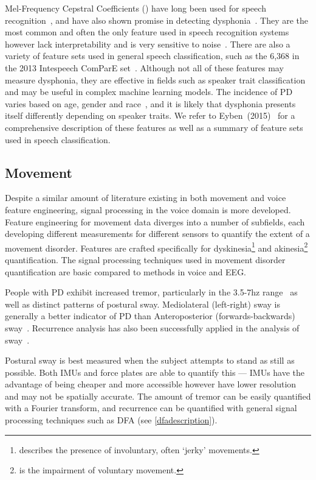 \documentclass[12pt, twoside]{book}
\renewcommand\emph[1]{\textit{\color{USred}{#1}}}
\begin{document}
Mel-Frequency Cepstral Coefficients (\emph{MFCC}) have long been used for speech recognition~\cite{mfcc}, and have also shown promise in detecting dysphonia~\cite{mfccml}. They are the most common and often the only feature used in speech recognition systems however lack interpretability and is very sensitive to noise~\cite{mfccrobust}. There are also a variety of feature sets used in general speech classification, such as the 6,368 in the 2013 Intespeech ComParE set~\cite{is2013}. Although not all of these features may measure dysphonia, they are effective in fields such as speaker trait classification and may be useful in complex machine learning models. The incidence of PD varies based on age, gender and race~\cite{ageracial,racial}, and it is likely that dysphonia presents itself differently depending on speaker traits. We refer to Eyben~(2015)~\cite{ostextbook} for a comprehensive description of these features as well as a summary of feature sets used in speech classification.

\subsection{Movement}\label{movementfeatures}
Despite a similar amount of literature existing in both movement and voice feature engineering, signal processing in the voice domain is more developed. Feature engineering for movement data diverges into a number of subfields, each developing different measurements for different sensors to quantify the extent of a movement disorder. Features are crafted specifically for dyskinesia\footnote{\emph{Dyskinesia} describes the presence of involuntary, often `jerky' movements.} and akinesia\footnote{\emph{Akinesia} is the impairment of voluntary movement.} quantification. The signal processing techniques used in movement disorder quantification are basic compared to methods in voice and EEG.

People with PD exhibit increased tremor, particularly in the 3.5-7hz range~\cite{duval2004detection} as well as distinct patterns of postural sway. Mediolateral (left-right) sway is generally a better indicator of PD than Anteroposterior (forwards-backwards) sway~\cite{swayapmp}. Recurrence analysis has also been successfully applied in the analysis of sway~\cite{palmerini2011tremor, posturalswaylongitudinal}. 

Postural sway is best measured when the subject attempts to stand as still as possible. Both IMUs and force plates are able to quantify this --- IMUs have the advantage of being cheaper and more accessible however have lower resolution and may not be spatially accurate. The amount of tremor can be easily quantified with a Fourier transform, and recurrence can be quantified with general signal processing techniques such as DFA (see \ref{dfadescription}).
\end{document}
